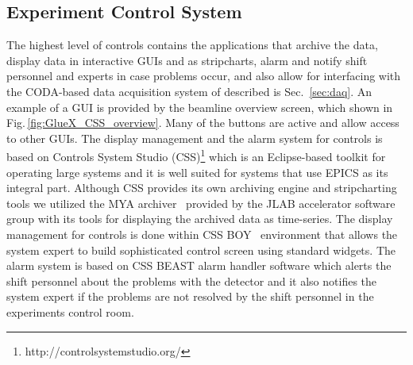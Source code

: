 \subsection{Experiment Control System \label{sec:alarms}}
The highest level of controls contains the applications that archive the data, display data in interactive GUIs and as stripcharts, alarm and notify shift personnel and experts in case problems occur, and also allow for interfacing with the CODA-based data acquisition system of \gx{} described is Sec.~\ref{sec:daq}.
An example of a GUI is provided by the beamline overview screen, which shown in Fig.\,\ref{fig:GlueX_CSS_overview}. Many of the buttons are active and allow access to other GUIs.
The display management and the alarm system for \gx{} controls is based on Controls System Studio (CSS)\footnote{http://controlsystemstudio.org/}  which is an Eclipse-based toolkit for operating large systems and it is well suited for systems that use EPICS as its integral part. Although CSS provides its own archiving engine and stripcharting tools we utilized the MYA archiver~\cite{Slominski:2009icaleps} provided by the JLAB accelerator software group with its tools for displaying the archived data as time-series. The display management for \gx{} controls is done within CSS BOY~\cite{Chen:2011icaleps} environment that allows the system expert to build sophisticated control screen using standard widgets. The alarm system is based on CSS BEAST\cite{Kasemir:2009icaleps} alarm handler software which alerts the shift personnel about the problems with the detector and it also notifies the system expert if the problems are not resolved by the shift personnel in the experiments control room. 